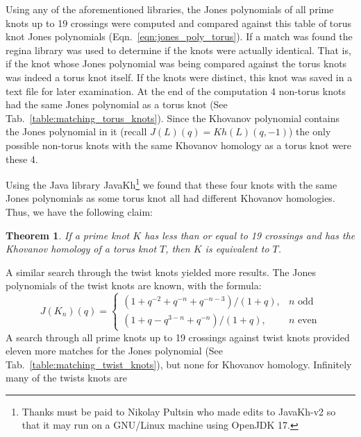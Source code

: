 \documentclass{article}
\theoremstyle{plain}
\newtheorem{theorem}{Theorem}
\begin{document}
        Using any of the aforementioned libraries, the Jones polynomials of all
        prime knots up to 19 crossings were computed and compared against this
        table of torus knot Jones polynomials (Eqn.~\ref{eqn:jones_poly_torus}).
        If a match was found the regina library was used to determine if the
        knots were actually identical. That is, if the knot whose Jones
        polynomial was being compared against the torus knots was indeed a
        torus knot itself. If the knots were distinct, this knot was saved in a
        text file for later examination. At the end of the computation 4
        non-torus knots had the same Jones polynomial as a torus knot
        (See Tab.~\ref{table:matching_torus_knots}).
        Since the Khovanov polynomial contains the Jones polynomial in it
        (recall $J(L)(q)=Kh(L)(q,-1)$) the only possible non-torus knots with
        the same Khovanov homology as a torus knot were these 4.
        \par\hfill\par
        Using the Java library JavaKh\footnote{%
            Thanks must be paid to Nikolay Pultsin who made edits to
            JavaKh-v2 so that it may run on a GNU/Linux machine using
            OpenJDK 17.
        }
        we found that these four knots with the same Jones polynomials as some
        torus knot all had different Khovanov homologies. Thus, we have the
        following claim:
        \begin{theorem}
            If a prime knot $K$ has less than or equal to 19 crossings and has
            the Khovanov homology of a torus knot $T$,
            then $K$ is equivalent to $T$.
        \end{theorem}
        A similar search through the twist knots yielded more results.
        The Jones polynomials of the twist knots are known, with the formula:
        \begin{equation}
            J(K_{n})(q)=
            \begin{cases}
                (1+q^{-2}+q^{-n}+q^{-n-3})/(1+q),&n\textrm{ odd}\\
                (1+q-q^{3-n}+q^{-n})/(1+q),&n\textrm{ even}
            \end{cases}
        \end{equation}
        A search through all prime knots up to 19 crossings against twist knots
        provided eleven more matches for the Jones polynomial
        (See Tab.~\ref{table:matching_twist_knots}), but
        none for Khovanov homology. Infinitely many of the twists knots are
\end{document}
